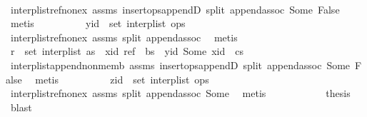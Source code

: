 \begin{isabellebody}
\ \ \ \ \ \ \ \ \ \ \isamarkupfalse%
\ interp{\isacharunderscore}list{\isacharunderscore}ref{\isacharunderscore}nonex\ assms{\isacharparenleft}{}{\isacharparenright}\ insert{\isacharunderscore}ops{\isacharunderscore}appendD\ split\ append{\isachardot}assoc\ Some\ False\ \isamarkupfalse%
\ metis\isanewline
\ \ \ \ \ \ \ \ \isamarkupfalse%
\ {\isachardoublequoteopen}yid\ {\isasymnotin}\ set\ {\isacharparenleft}interp{\isacharunderscore}list\ ops{\isacharparenright}{\isachardoublequoteclose}\isanewline
\ \ \ \ \ \ \ \ \ \ \isamarkupfalse%
\ interp{\isacharunderscore}list{\isacharunderscore}ref{\isacharunderscore}nonex\ assms{\isacharparenleft}{}{\isacharparenright}\ split\ append{\isachardot}assoc\ \isamarkupfalse%
\ metis\isanewline
\ \ \ \ \ \ \ \ \isamarkupfalse%
\ \isamarkupfalse%
\ {\isachardoublequoteopen}r\ {\isasymnotin}\ set\ {\isacharparenleft}interp{\isacharunderscore}list\ {\isacharparenleft}as\ {\isacharat}\ {\isacharbrackleft}{\isacharparenleft}xid{\isacharcomma}\ ref{\isacharparenright}{\isacharbrackright}\ {\isacharat}\ bs\ {\isacharat}\ {\isacharbrackleft}{\isacharparenleft}yid{\isacharcomma}\ Some\ xid{\isacharparenright}{\isacharbrackright}\ {\isacharat}\ cs{\isacharparenright}{\isacharparenright}{\isachardoublequoteclose}\isanewline
\ \ \ \ \ \ \ \ \ \ \isamarkupfalse%
\ interp{\isacharunderscore}list{\isacharunderscore}append{\isacharunderscore}non{\isacharunderscore}memb\ assms{\isacharparenleft}{}{\isacharparenright}\ insert{\isacharunderscore}ops{\isacharunderscore}appendD\ split\ append{\isachardot}assoc\ Some\ False\ \isamarkupfalse%
\ metis\isanewline
\ \ \ \ \ \ \ \ \isamarkupfalse%
\ {\isachardoublequoteopen}zid\ {\isasymnotin}\ set\ {\isacharparenleft}interp{\isacharunderscore}list\ ops{\isacharparenright}{\isachardoublequoteclose}\isanewline
\ \ \ \ \ \ \ \ \ \ \isamarkupfalse%
\ interp{\isacharunderscore}list{\isacharunderscore}ref{\isacharunderscore}nonex\ assms{\isacharparenleft}{}{\isacharparenright}\ split\ append{\isachardot}assoc\ Some\ \isamarkupfalse%
\ metis\isanewline
\ \ \ \ \ \ \ \ \isamarkupfalse%
\ \isamarkupfalse%
\ {\isacharquery}thesis\ \isamarkupfalse%
\ blast\isanewline
\ \ \ \ \ \ \isamarkupfalse%
\isanewline
\ \ \ \ \isamarkupfalse%
\isanewline
\ \ \isamarkupfalse%

\end{isabellebody}
